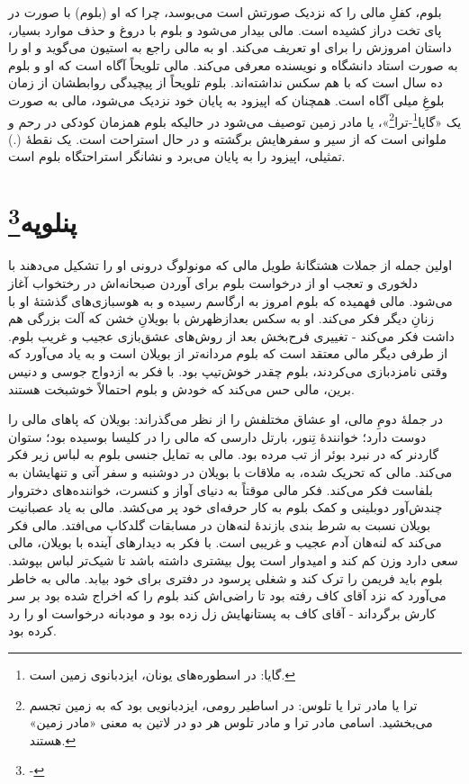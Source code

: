 \documentclass[12pt]{book}
\begin{document}
    بلوم، کفلِ مالی را که نزدیک صورتش است می‌بوسد، چرا که او (بلوم) با صورت در پای تخت دراز کشیده است. مالی بیدار می‌شود و بلوم با دروغ و حذف موارد بسیار، داستان امروزش را برای او تعریف می‌کند. او به مالی راجع به استیون می‌گوید و او را به صورت استاد دانشگاه و نویسنده معرفی می‌کند. مالی تلویحاً آگاه است  که او و بلوم ده سال است که با هم سکس نداشته‌اند. بلوم تلویحاً از پیچیدگی روابطشان از زمان بلوغِ میلی آگاه است. همچنان که اپیزود به پایان خود نزدیک می‌شود، مالی به صورت یک «گایا\footnote{گایا: در اسطوره‌های یونان، ایزدبانوی زمین است.}-ترا\footnote{ترا یا مادر ترا یا تلوس: در اساطیر رومی، ایزدبانویی بود که به زمین تجسم می‌بخشید. اسامی مادر ترا و مادر تلوس هر دو در لاتین به معنی «مادر زمین» هستند.}»، یا مادر زمین توصیف می‌شود در حالیکه بلوم همزمان کودکی در رحم و ملوانی است که از سیر و سفرهایش برگشته و در حال استراحت است. یک نقطۀ (.) تمثیلی، اپیزود را به پایان می‌برد و نشانگر استراحتگاه بلوم است.

    \chapter[پنلوپه]{پنلوپه\protect\footnote{-}}\label{ep:18}
    اولین جمله از جملات هشتگانۀ طویل مالی که مونولوگ درونی او را تشکیل می‌دهند با دلخوری و تعجب او از درخواست بلوم برای آوردن صبحانه‌اش در رختخواب آغاز می‌شود. مالی فهمیده که بلوم امروز به ارگاسم رسیده و به هوسبازی‌های گذشتۀ او با زنانِ دیگر فکر می‌کند. او به سکس بعدازظهرش با بویلانِ خشن که آلت بزرگی هم داشت فکر می‌کند - تغییری فرح‌بخش بعد از روش‌های عشق‌بازی عجیب و غریب بلوم. از طرفی دیگر مالی معتقد است که بلوم مردانه‌تر از بویلان است و به یاد می‌آورد که وقتی نامزدبازی می‌کردند، بلوم چقدر خوش‌تیپ بود. با فکر به ازدواج جوسی و دنیس برین، مالی حس می‌کند که خودش و بلوم احتمالاً خوشبخت هستند.

    در جملۀ دومِ مالی، او عشاق مختلفش را از نظر می‌گذراند: بویلان که پاهای مالی را دوست دارد؛ خوانندۀ تِنور، بارتل دارسی که مالی را در کلیسا بوسیده بود؛ ستوان گاردنر که در نبرد بوئر از تب مرده بود. مالی به تمایل جنسی بلوم به لباس زیر فکر می‌کند. مالی که تحریک شده، به ملاقات با بویلان در دوشنبه و سفر آتی و تنهایشان به بلفاست فکر می‌کند. فکر مالی موقتاً به دنیای آواز و کنسرت، خواننده‌های دختروار چندش‌آور دوبلینی و کمک بلوم به کار حرفه‌ای خود پر می‌کشد. مالی به یاد عصبانیت بویلان نسبت به شرط بندی بازندۀ لنه‌هان در مسابقات گلدکاپ می‌افتد. مالی فکر می‌کند که لنه‌هان آدم عجیب و غریبی است. با فکر به دیدارهای آینده با بویلان، مالی سعی دارد وزن کم کند و امیدوار است پول بیشتری داشته باشد تا شیک‌تر لباس بپوشد. بلوم باید فریمن را ترک کند و شغلی پرسود در دفتری برای خود بیابد. مالی به خاطر می‌آورد که نزد آقای کاف رفته بود تا راضی‌اش کند بلوم را که اخراج شده بود بر سر کارش برگرداند - آقای کاف به پستانهایش زل زده بود و مودبانه درخواست او را رد کرده بود.
\end{document}
